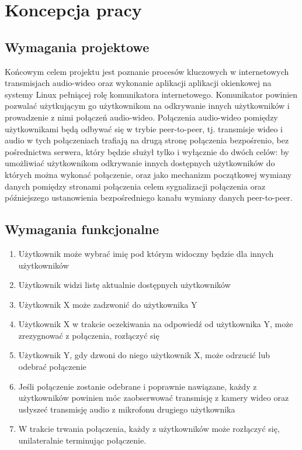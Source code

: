 \chapter{Koncepcja pracy}

\section{Wymagania projektowe}

Końcowym celem projektu jest poznanie procesów kluczowych w internetowych transmisjach audio-wideo
oraz wykonanie aplikacji aplikacji okienkowej na systemy Linux pełniącej rolę komunikatora
internetowego. Komunikator powinien pozwalać użytkującym go użytkownikom na odkrywanie innych
użytkowników i prowadzenie z nimi połączeń audio-wideo. Połączenia audio-wideo pomiędzy
użytkownikami będą odbywać się w trybie peer-to-peer, tj. transmisje wideo i audio w tych
połączeniach trafiają na drugą stronę połączenia bezpośrenio, bez pośrednictwa serwera, który będzie
służył tylko i wyłącznie do dwóch celów: by umożliwiać użytkownikom odkrywanie innych dostępnych
użytkowników do których można wykonać połączenie, oraz jako mechanizm początkowej wymiany danych
pomiędzy stronami połączenia celem sygnalizacji połączenia oraz późniejszego ustanowienia
bezpośredniego kanału wymiany danych peer-to-peer.

\section{Wymagania funkcjonalne}

\begin{enumerate}
	\item Użytkownik może wybrać imię pod którym widoczny będzie dla innych użytkowników
	\item Użytkownik widzi listę aktualnie dostępnych użytkowników
	\item Użytkownik X może zadzwonić do użytkownika Y
	\item Użytkownik X w trakcie oczekiwania na odpowiedź od użytkownika Y, może zrezygnować z
	      połączenia, rozłączyć się
	\item Użytkownik Y, gdy dzwoni do niego użytkownik X, może odrzucić lub odebrać połączenie
	\item Jeśli połączenie zostanie odebrane i poprawnie nawiązane, każdy z użytkowników powinien
	      móc zaobserwować transmisję z kamery wideo oraz usłyszeć transmisję audio z mikrofonu
	      drugiego użytkownika
	\item W trakcie trwania połączenia, każdy z użytkowników może rozłączyć się, unilateralnie
	      terminując połączenie.
\end{enumerate}

